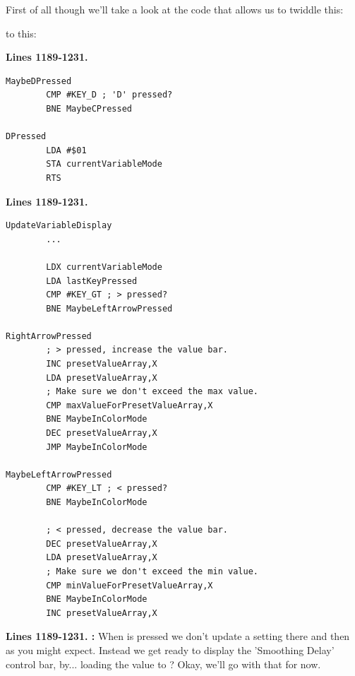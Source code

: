 First of all though we'll take a look at the code that allows us to
twiddle this:

    \begin{adjustbox}{width=9cm}
    \end{adjustbox}

to this:

    \begin{adjustbox}{width=8.2cm}
    \end{adjustbox}

\clearpage

\textbf{Lines 1189-1231. }
\begin{lstlisting}[caption=From \icode{CheckKeyboardInput}.]
MaybeDPressed   
        CMP #KEY_D ; 'D' pressed?
        BNE MaybeCPressed

DPressed
        LDA #$01
        STA currentVariableMode
        RTS 
\end{lstlisting}
\textbf{Lines 1189-1231. }
\begin{lstlisting}[caption=From \icode{CheckKeyboardInputForActiveVariable}.]
UpdateVariableDisplay   
        ...

        LDX currentVariableMode
        LDA lastKeyPressed
        CMP #KEY_GT ; > pressed?
        BNE MaybeLeftArrowPressed

RightArrowPressed
        ; > pressed, increase the value bar.
        INC presetValueArray,X
        LDA presetValueArray,X
        ; Make sure we don't exceed the max value.
        CMP maxValueForPresetValueArray,X
        BNE MaybeInColorMode
        DEC presetValueArray,X
        JMP MaybeInColorMode

MaybeLeftArrowPressed   
        CMP #KEY_LT ; < pressed?
        BNE MaybeInColorMode

        ; < pressed, decrease the value bar.
        DEC presetValueArray,X
        LDA presetValueArray,X
        ; Make sure we don't exceed the min value.
        CMP minValueForPresetValueArray,X
        BNE MaybeInColorMode
        INC presetValueArray,X

\end{lstlisting}
\clearpage
\textbf{Lines 1189-1231. :} When  is pressed we don't
update a setting there and then as you might expect. Instead we get ready to display the 'Smoothing
Delay' control bar, by... loading the value  to ? Okay, we'll
go with that for now.

